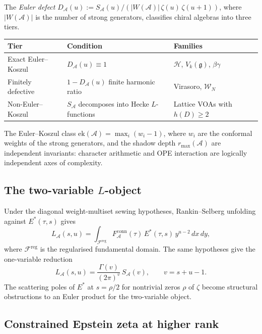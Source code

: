 \documentclass[11pt,reqno]{amsart}
\theoremstyle{definition}
\theoremstyle{remark}
\providecommand{\cA}{\mathcal{A}}
\providecommand{\cF}{\mathcal{F}}
\providecommand{\cH}{\mathcal{H}}
\providecommand{\cW}{\mathcal{W}}
\providecommand{\fg}{\mathfrak{g}}
\providecommand{\conn}{\mathrm{conn}}
\numberwithin{equation}{section}
\begin{document}
The \emph{Euler defect}
$D_\cA(u) := S_\cA(u)/(|W(\cA)|\,\zeta(u)\,\zeta(u+1))$,
where $|W(\cA)|$ is the number of strong generators, classifies
chiral algebras into three tiers.

\begin{center}
\renewcommand{\arraystretch}{1.15}
\begin{tabular}{@{} l l l @{}}
\toprule
\textbf{Tier} & \textbf{Condition} & \textbf{Families} \\ \midrule
Exact Euler--Koszul & $D_\cA(u) \equiv 1$
  & $\cH$, $V_k(\fg)$, $\beta\gamma$ \\
Finitely defective & $1 - D_\cA(u)$ finite harmonic ratio
  & Virasoro, $\cW_N$ \\
Non-Euler--Koszul & $S_\cA$ decomposes into Hecke $L$-functions
  & Lattice VOAs with $h(D) \ge 2$ \\
\bottomrule
\end{tabular}
\end{center}

The Euler--Koszul class $\mathrm{ek}(\cA) = \max_i(w_i - 1)$,
where $w_i$ are the conformal weights of the strong generators,
and the shadow depth $r_{\max}(\cA)$ are independent invariants:
character arithmetic and OPE interaction are logically independent
axes of complexity.

\subsection{The two-variable $L$-object}

Under the diagonal weight-multiset sewing hypotheses, Rankin--Selberg
unfolding against $E^*(\tau, s)$ gives
\begin{equation}\label{eq:two-variable-L}
  L_\cA(s, u)
  = \int_{\cF^{\mathrm{reg}}}
  F_\cA^{\conn}(\tau)\, E^*(\tau, s)\, y^{u-2}\, dx\, dy,
\end{equation}
where $\cF^{\mathrm{reg}}$ is the regularised fundamental domain.
The same hypotheses give the one-variable reduction
\begin{equation}\label{eq:sewing-hecke}
  L_\cA(s, u)
  = \frac{\Gamma(v)}{(2\pi)^v}\, S_\cA(v),
  \qquad
  v = s + u - 1.
\end{equation}
The scattering poles of $E^*$ at $s = \rho/2$ for nontrivial zeros
$\rho$ of $\zeta$ become structural obstructions to an Euler product
for the two-variable object.

\subsection{Constrained Epstein zeta at higher rank}
\end{document}
